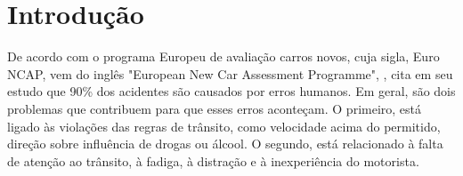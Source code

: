 \documentclass[
	12pt,				%
    oneside,			%
	a4paper,			%
	english,			%
	french,				%
	spanish,			%
	brazil,				%
	]{abntex2}
\begin{document}






\tableofcontents*


\textual


\chapter{Introdução} %

De acordo com o programa Europeu de avaliação carros novos, cuja sigla, Euro NCAP, vem do inglês "European New Car Assessment Programme", , cita em seu estudo que 90\% dos acidentes são causados por erros  humanos. Em geral, são dois problemas que contribuem para que esses erros aconteçam. O primeiro, está ligado às violações das regras de trânsito, como velocidade acima do permitido, direção sobre influência de drogas ou álcool. O segundo, está relacionado à falta de atenção ao trânsito, à fadiga, à distração e à inexperiência do motorista.
\end{document}
